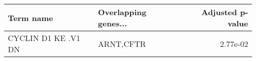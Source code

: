 \begin{tabular}{llr}
\toprule
          Term name & Overlapping genes... &  Adjusted p-value \\
\midrule
CYCLIN D1 KE .V1 DN &            ARNT,CFTR &          2.77e-02 \\
\bottomrule
\end{tabular}
